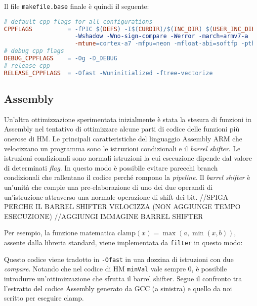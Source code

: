 Il file \verb|makefile.base| finale è quindi il seguente:\\

\begin{lstlisting}[language=make]
# default cpp flags for all configurations
CPPFLAGS          = -fPIC $(DEFS) -I$(CURDIR)/$(INC_DIR) $(USER_INC_DIRS) -Wall 
                    -Wshadow -Wno-sign-compare -Werror -march=armv7-a 
                    -mtune=cortex-a7 -mfpu=neon -mfloat-abi=softfp -pthread
# debug cpp flags
DEBUG_CPPFLAGS    = -Og -D_DEBUG
# release cpp
RELEASE_CPPFLAGS  = -Ofast -Wuninitialized -ftree-vectorize
\end{lstlisting}

\subsection{Assembly}
Un'altra ottimizzazione sperimentata inizialmente è stata la stesura di 
funzioni in Assembly nel tentativo di ottimizzare alcune parti di codice delle 
funzioni più onerose di HM.
Le principali caratteristiche del linguaggio Assembly ARM che velocizzano un 
programma sono le istruzioni condizionali e il \emph{barrel shifter}. \newline
Le istruzioni condizionali sono normali istruzioni la cui esecuzione dipende
dal valore di determinati \emph{flag}. In questo modo è possibile evitare 
parecchi branch condizionali che rallentano il codice perché rompono la 
\emph{pipeline}.\newline
Il \emph{barrel shifter} è un'unità che compie una pre-elaborazione di uno dei 
due operandi di un'istruzione attraverso una normale operazione di shift dei 
bit. \newline
//SPIGA PERCHE IL BARREL SHIFTER VELOCIZZA (NON AGGIUNGE TEMPO ESECUZIONE)
//AGGIUNGI IMMAGINE BARREL SHIFTER \newline

\par Per esempio, la funzione matematica $\text{clamp}(x) = 
\max(a,\min(x,b))$, assente dalla libreria standard, viene implementata da 
\verb+filter+ in questo modo:

Questo codice viene tradotto in \verb|-Ofast| in una dozzina di istruzioni con 
due \emph{compare}. Notando che nel codice di HM \verb|minVal| vale sempre 0, è 
possibile introdurre un'ottimizzazione che sfrutta il barrel shifter. \newline
Segue il confronto tra l'estratto del codice Assembly generato da GCC (a 
sinistra) e quello da noi scritto per eseguire clamp.

